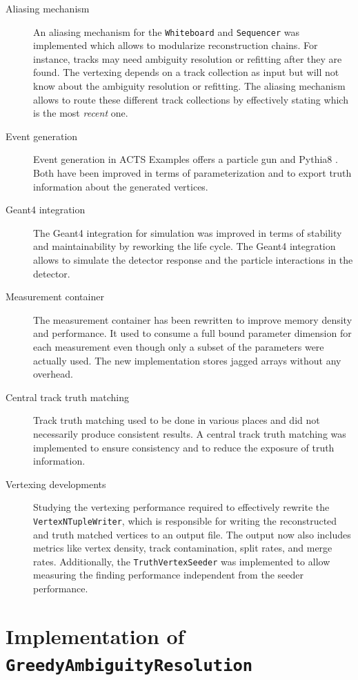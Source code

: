 \begin{description}
    \item[Aliasing mechanism] An aliasing mechanism for the \texttt{Whiteboard} and \texttt{Sequencer} was implemented which allows to modularize reconstruction chains. For instance, tracks may need ambiguity resolution or refitting after they are found. The vertexing depends on a track collection as input but will not know about the ambiguity resolution or refitting. The aliasing mechanism allows to route these different track collections by effectively stating which is the most \textit{recent} one.
    \item[Event generation] Event generation in ACTS Examples offers a particle gun and Pythia8 \cite{pythia8}. Both have been improved in terms of parameterization and to export truth information about the generated vertices.
    \item[Geant4 integration] The Geant4 \cite{geant4-2003}\cite{geant4-2006}\cite{geant4-2016} integration for simulation was improved in terms of stability and maintainability by reworking the life cycle. The Geant4 integration allows to simulate the detector response and the particle interactions in the detector.
    \item[Measurement container] The measurement container has been rewritten to improve memory density and performance. It used to consume a full bound parameter dimension for each measurement even though only a subset of the parameters were actually used. The new implementation stores jagged arrays without any overhead.
    \item[Central track truth matching] Track truth matching used to be done in various places and did not necessarily produce consistent results. A central track truth matching was implemented to ensure consistency and to reduce the exposure of truth information.
    \item[Vertexing developments] Studying the vertexing performance required to effectively rewrite the \texttt{VertexNTupleWriter}, which is responsible for writing the reconstructed and truth matched vertices to an output file. The output now also includes metrics like vertex density, track contamination, split rates, and merge rates. Additionally, the \texttt{TruthVertexSeeder} was implemented to allow measuring the finding performance independent from the seeder performance.
\end{description}

\section{Implementation of \texttt{GreedyAmbiguityResolution}}
\label{sec:dev/general/greedy-ambiguity-resolution}

